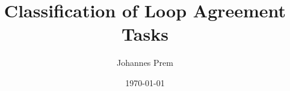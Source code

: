 
\subject{Bachelor Thesis}
\title{Classification of Loop Agreement Tasks}
\author{Johannes Prem}
\date{\today}

\maketitle
\thispagestyle{empty}

\newpage
